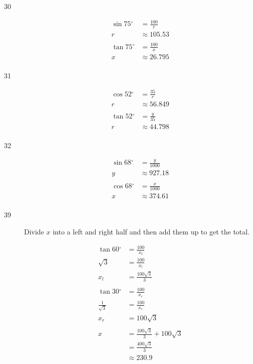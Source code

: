 \documentclass{exam}
\newcommand{\dg}{\ensuremath{^\circ}}
\begin{document}
\begin{description}
      \item[30]
        \begin{align*}
          \sin 75 \dg & = \frac{100}{r} \\
          r           & \approx \boxed{ 105.53 } \\
          \\
          \tan 75 \dg & = \frac{100}{x} \\
          x           & \approx \boxed{ 26.795 } \\
        \end{align*}

      \item[31]
        \begin{align*}
          \cos 52 \dg & = \frac{35}{r} \\
          r           & \approx \boxed{ 56.849 } \\
          \\
          \tan 52 \dg & = \frac{y}{35} \\
          r           & \approx \boxed{ 44.798 } \\
        \end{align*}

      \item[32]
        \begin{align*}
          \sin 68 \dg & = \frac{y}{1000} \\
          y           & \approx \boxed{ 927.18 } \\
          \\
          \cos 68 \dg & = \frac{x}{1000} \\
          x           & \approx \boxed{ 374.61 } \\
        \end{align*}

      \item[39]
        Divide $x$ into a left and right half and then add them up to get the total.

        \begin{align*}
          \tan 60 \dg & = \frac{100}{x_l} \\
          \sqrt{3}    & = \frac{100}{x_l} \\
          x_l         & = \frac{100 \sqrt{3}}{3} \\
          \\
          \tan 30 \dg        & = \frac{100}{x_r} \\
          \frac{1}{\sqrt{3}} & = \frac{100}{x_r} \\
          x_r                & = 100 \sqrt{3} \\
          \\
          x & = \frac{100 \sqrt{3}}{3} + 100 \sqrt{3} \\
            & = \frac{400 \sqrt{3}}{3} \\
            & \approx \boxed{ 230.9 }
        \end{align*}


\end{description}
\end{document}
